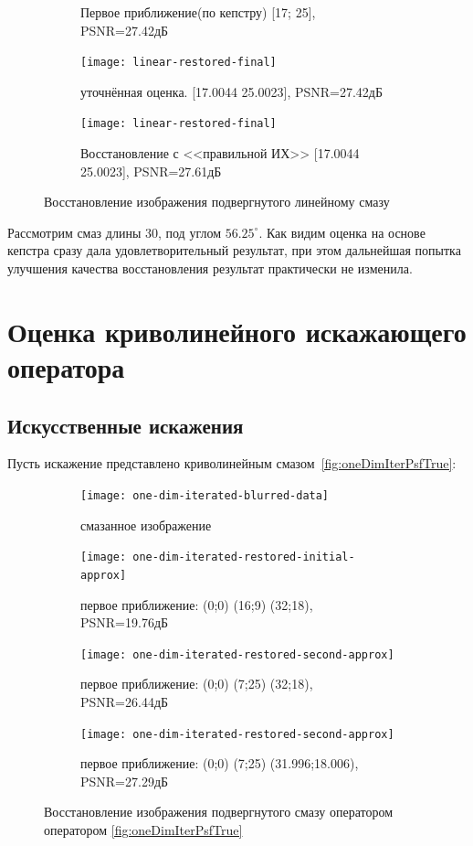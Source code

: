 \begin{figure}[h!]
\begin{subfigure}[t]{0.32\textwidth}
	\caption{Первое приближение(по кепстру) [17; 25], PSNR=27.42дБ}
	\label{fig:liftingbodyInitial}
	\end{subfigure}
	\hfill
	\begin{subfigure}[t]{0.32\textwidth}
		\centering
		\texttt{[image: linear-restored-final]}
		\caption{уточнённая оценка. [17.0044 25.0023], PSNR=27.42дБ}
		\label{fig:liftingFinal}
	\end{subfigure}
	\hfill
	\begin{subfigure}[t]{0.32\textwidth}
		\centering
		\texttt{[image: linear-restored-final]}
		\caption{Восстановление с <<правильной ИХ>> [17.0044 25.0023], PSNR=27.61дБ}
		\label{fig:liftingReal}
	\end{subfigure}
	\caption{Восстановление изображения подвергнутого линейному смазу}
	\label{fig:linear}
\end{figure}

Рассмотрим смаз длины 30, под углом $56.25^\circ$. Как видим оценка на основе кепстра сразу дала удовлетворительный результат, при этом дальнейшая попытка улучшения качества восстановления результат практически не изменила.

\section{Оценка криволинейного искажающего оператора}
\subsection{Искусственные искажения}
Пусть искажение представлено криволинейным смазом~\ref{fig:oneDimIterPsfTrue}:
\begin{figure}[h!]
	\begin{subfigure}[t]{0.45\textwidth}
		\centering
		\texttt{[image: one-dim-iterated-blurred-data]}
		\caption{смазанное изображение}
		\label{fig:oneDimIterBlurred}
	\end{subfigure}
	\hfill
	\begin{subfigure}[t]{0.45\textwidth}
		\centering
		\texttt{[image: one-dim-iterated-restored-initial-approx]}
		\caption{первое приближение: (0;0) (16;9) (32;18), PSNR=19.76дБ}
		\label{fig:oneDimIterInitial}
	\end{subfigure}

	\begin{subfigure}[t]{0.45\textwidth}
		\centering
		\texttt{[image: one-dim-iterated-restored-second-approx]}
		\caption{первое приближение: (0;0) (7;25) (32;18), PSNR=26.44дБ}
		\label{fig:oneDimIterSecond}
	\end{subfigure}
	\hfill
	\begin{subfigure}[t]{0.45\textwidth}
		\centering
		\texttt{[image: one-dim-iterated-restored-second-approx]}
		\caption{первое приближение: (0;0) (7;25) (31.996;18.006), PSNR=27.29дБ}
		\label{fig:oneDimIterFinal}
	\end{subfigure}
	\caption{Восстановление изображения подвергнутого смазу оператором  оператором \ref{fig:oneDimIterPsfTrue}}
	\label{fig:oneDimIter}
\end{figure}

